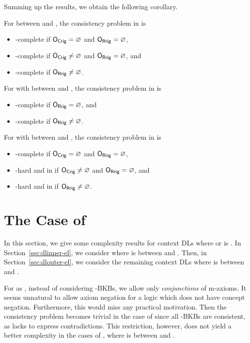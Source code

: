 Summing up the results, we obtain the following corollary.

\begin{corollary}
  For \LMLO between \ELALC and \SHOQSHOQ, the consistency problem in \LMLO is
  \begin{itemize}
  \item \ExpTime-complete if  $\mathsf{O_{Crig}}=\varnothing$ and $\mathsf{O_{Rrig}}=\varnothing$,
  \item \NExpTime-complete if $\mathsf{O_{Crig}}\ne\varnothing$ and $\mathsf{O_{Rrig}}=\varnothing$, and
  \item \TwoExpTime-complete if $\mathsf{O_{Rrig}}\ne\varnothing$.
  \end{itemize}
  For \SHOIQLO with \LO between \ALC and \SHOQ, the consistency problem in \SHOIQLO is
  \begin{itemize}
  \item \NExpTime-complete if $\mathsf{O_{Rrig}}=\varnothing$, and
  \item \TwoExpTime-complete if $\mathsf{O_{Rrig}}\neq\varnothing$.
  \end{itemize}
  For \LMSHOIQ with \LM between \EL and \SHOIQ, the consistency problem in \LMSHOIQ is
  \begin{itemize}
  \item \NExpTime-complete if  $\mathsf{O_{Crig}}=\varnothing$ and $\mathsf{O_{Rrig}}=\varnothing$,
  \item \NExpTime-hard and in \TwoNExpTime if $\mathsf{O_{Crig}}\ne\varnothing$ and $\mathsf{O_{Rrig}}=\varnothing$, and
  \item \TwoExpTime-hard and in \TwoNExpTime if $\mathsf{O_{Rrig}}\ne\varnothing$.
  \end{itemize}
\end{corollary}

\section{The Case of \texorpdfstring{\EL}{EL}}
\label{sec:case-el} 

In this section, we give some complexity results for context DLs
\LMLO where \LM or \LO is \EL.
%
In Section~\ref{sec:dlinner-el}, we consider \LMEL where \LM is between \ALC and \SHOIQ.  Then, in
Section~\ref{sec:dlouter-el}, we consider the remaining context DLs \ELLO where \LO is between \ALC
and \SHOIQ.

For \EL as \LO, instead of considering \ELLO-BKBs, we allow only \emph{conjunctions} of m-axioms. It
seems unnatural to allow axiom negation for a logic which does not have concept
negation. Furthermore, this would miss any practical motivation. Then the consistency problem becomes trivial in the case of \ELEL since all
\ELEL-BKBs are consistent, as \EL lacks to express contradictions.
%
This restriction, however, does not yield a better complexity in the cases of \ELLO, where \LO is
between \ALC and \SHOQ.

